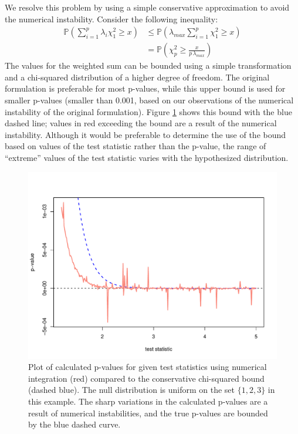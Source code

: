 We resolve this problem by using a simple conservative approximation to
avoid the numerical instability. Consider the
following inequality:
\begin{align}
\mathbb{P} \left(\sum_{i=1}^{p} \lambda_i \chi^2_1 \geq x \right) &\leq \mathbb{P} \left( \lambda_{max} \sum_{i=1}^{p} \chi^2_1 \geq x \right) \label{ineq1} \\
&= \mathbb{P} \left(\chi^2_p \geq \frac{x}{p \, \lambda_{max}} \right)
\label{ineq2}
\end{align}
The values for the weighted sum can be bounded using a simple transformation
and a chi-squared distribution of a higher degree of freedom. 
The original formulation is preferable for most p-values, while
this upper bound is used for smaller p-values (smaller than 0.001,
based on our observations of the numerical instability of the original
formulation).  Figure \ref{cvmissues} shows this bound with the blue dashed
line; values in red exceeding the bound are a result of the numerical
instability.  Although it would be preferable to determine the use of
the bound based on values of the test statistic rather than the p-value,
the range of ``extreme'' values of the test statistic varies with the
hypothesized distribution.



\begin{figure}
\begin{center}
\includegraphics[scale=0.4]{fig1.pdf}
\end{center}
\caption{Plot of calculated p-values for given test statistics
using numerical integration
(red) compared to the conservative chi-squared bound (dashed blue). 
The null distribution is uniform on the set $\{1,2,3\}$ in this example.
The sharp variations in the calculated p-values are a result of numerical
instabilities, and the true p-values are bounded by the blue dashed curve.}
\label{cvmissues}
\end{figure}


